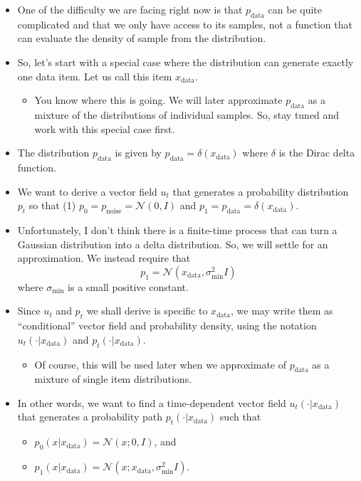 \documentclass[10pt]{article}
\newcommand{\mrm}[1]{\mathrm{#1}}
\newcommand{\mcal}[1]{\mathcal{#1}}
\newcommand{\data}{\mathrm{data}}
\begin{document}
\begin{itemize}
  \item One of the difficulty we are facing right now is that $p_{\mrm{data}}$ can be quite complicated and that we only have access to its samples, not a function that can evaluate the density of sample from the distribution.
  
  \item So, let's start with a special case where the distribution can generate exactly one data item. Let us call this item $x_{\mrm{data}}$. 
  \begin{itemize}
    \item You know where this is going. We will later approximate $p_{\mrm{data}}$ as a mixture of the distributions of individual samples. So, stay tuned and work with this special case first.
  \end{itemize}
  
  \item The distribution $p_{\mrm{data}}$ is given by $p_{\mrm{data}}  = \delta(x_{\mrm{data}})$ where $\delta$ is the Dirac delta function.
  
  \item We want to derive a vector field $u_t$ that generates a probability distribution $p_t$ so that (1) $p_0 = p_{\mrm{noise}} = \mcal{N}(0,I)$ and $p_1 = p_{\mrm{data}} = \delta(x_{\mrm{data}})$.
  
  \item Unfortunately, I don't think there is a finite-time process that can turn a Gaussian distribution into a delta distribution. So, we will settle for an approximation. We instead require that $$p_1 = \mcal{N}(x_{\mrm{data}}, \sigma_{\min}^2 I )$$ where $\sigma_{\min}$ is a small positive constant.

  \item Since $u_t$ and $p_t$ we shall derive is specific to $x_{\mrm{data}}$, we may write them as ``conditional'' vector field and probability density, using the notation $u_t(\cdot|x_{\mrm{data}})$ and $p_t(\cdot|x_{\mrm{data}})$.
  \begin{itemize}
    \item Of course, this will be used later when we approximate of $p_{\mrm{data}}$ as a mixture of single item distributions.
  \end{itemize}

  \item In other words, we want to find a time-dependent vector field $u_t(\cdot|x_{\data})$ that generates a probability path $p_t(\cdot|x_{\data})$ such that
  \begin{itemize}
    \item $p_0(x|x_{\mrm{data}}) = \mcal{N}(x; 0, I)$, and
    \item $p_1(x|x_{\mrm{data}}) = \mcal{N}(x; x_{\data}, \sigma_{\min}^2 I)$.
  \end{itemize}


\end{itemize}
\end{document}
